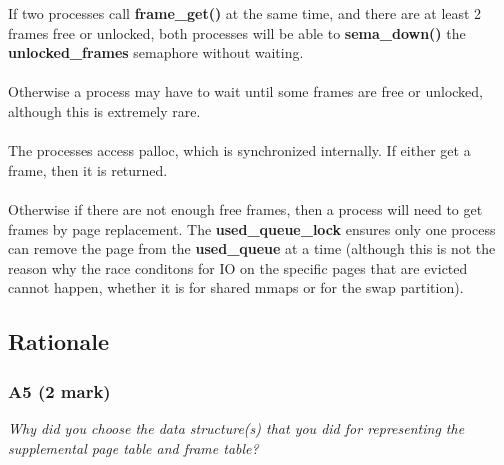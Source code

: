 \documentclass{report}
\newcommand{\question}[1]{\textit{#1} \ }
\newcommand{\fun}[1]{\textcolor{Emerald}{\textbf{#1}}}
\newcommand{\var}[1]{\textcolor{RoyalPurple}{\textbf{#1}}}
\begin{document}
				If two processes call \fun{frame\_get()} at the same time, and 
				there are at least 2 frames free or unlocked, both processes 
				will be able to \fun{sema\_down()} the \var{unlocked\_frames} 
				semaphore without waiting.
				\\
				\\ Otherwise a process may have to wait until some frames are 
				free or unlocked, although this is extremely rare.
				\\
				\\ The processes access palloc, which is synchronized internally.
				If either get a frame, then it is returned.
				\\ 
				\\ Otherwise if there are not enough free frames, then a 
				process will need to get frames by page replacement. 
				The \var{used\_queue\_lock} ensures only one process can remove
				the page from the \var{used\_queue} at a time (although
				this is not the reason why the race conditons for IO on the
				specific pages that are evicted cannot happen, whether it is
				for shared mmaps or for the swap partition).
			
		\subsection*{Rationale}
			\subsubsection*{A5 (2 mark)}
				\question{Why did you choose the data structure(s) that you did for 
				representing the supplemental page table and frame table?}
\end{document}
